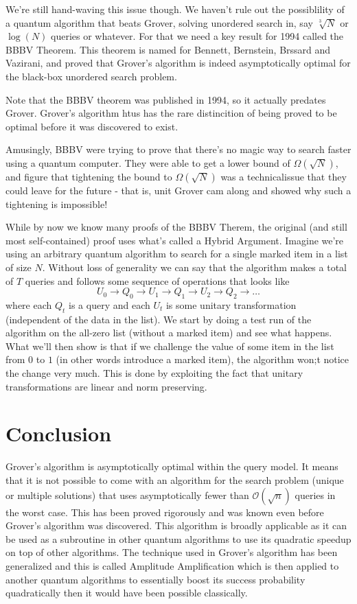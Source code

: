 We're still hand-waving this issue though. We haven't rule out the possiblility of a quantum algorithm that beats Grover, solving unordered search in, say $\sqrt[3]{N}$ or $\log (N)$ queries or whatever. For that we need a key result for 1994 called the BBBV Theorem. This theorem is named for Bennett, Bernstein, Brssard and Vazirani, and proved that Grover's algorithm is indeed asymptotically optimal for the black-box unordered search problem.


Note that the BBBV theorem was published in 1994, so it actually predates Grover. Grover's algorithm htus has the rare distincition of being proved to be optimal before it was discovered to exist.

Amusingly, BBBV were trying to prove that there's no magic way to search faster using a quantum computer. They were able to get a lower bound of $\Omega(\sqrt{N})$, and figure that tightening the bound to $\Omega(\sqrt{N})$ was a technicalissue that they could leave for the future - that is, unit Grover cam along and showed why such a tightening is impossible!

While by now we know many proofs of the BBBV Therem, the original (and still most self-contained) proof uses what's called a Hybrid Argument. Imagine we're using an arbitrary quantum algorithm to search for a single marked item in a list of size $N$. Without loss of generality we can say that the algorithm makes a total of $T$ queries and follows some sequence of operations that looks like
\[
U_0\rightarrow Q_0 \rightarrow U_1 \rightarrow Q_1\rightarrow U_2 \rightarrow Q_2 \rightarrow \ldots
\]
where each $Q_t$ is a query and each $U_t$ is some unitary transformation (independent of the data in the list). We start by doing a test run of the algorithm on the all-zero list (without a marked item) and see what happens. What we'll then show is that if we challenge the value of some item in the list from $0$ to $1$ (in other words introduce a marked item), the algorithm won;t notice the change very much. This is done by exploiting the fact that unitary transformations are linear and norm preserving.



\section{Conclusion}
Grover's algorithm  is asymptotically optimal within the query model. It means that it is not possible to come with an algorithm for the search problem (unique or multiple solutions) that uses asymptotically fewer than $\mathcal{O}(\sqrt{n})$ queries in the worst case. This has been proved rigorously and was known even before Grover's algorithm was discovered. This algorithm is broadly applicable as it can be used as a subroutine in other quantum algorithms to use its quadratic speedup on top of other algorithms. The technique used in Grover's algorithm has been generalized and this is called Amplitude Amplification which is then applied to another quantum algorithms to essentially boost its success probability quadratically then it would have been possible classically.

